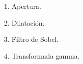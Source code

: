 \documentclass[12pt,a4paper]{article}
\providecommand{\tightlist}{%
  \setlength{\itemsep}{0pt}\setlength{\parskip}{0pt}}\usepackage{longtable,booktabs,array}
\providecommand{\tightlist}{%
  \setlength{\itemsep}{0pt}\setlength{\parskip}{2pt}}
\begin{document}
\begin{enumerate}
  \begin{enumerate}
  \tightlist
  \item
    Apertura.
  \item
    Dilatación.
  \item
    Filtro de Sobel.
  \item
    Transformada gamma.
  \end{enumerate}
\end{enumerate}
\end{document}
